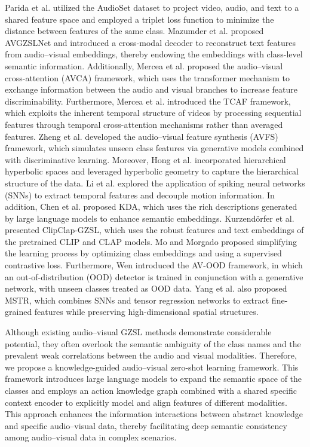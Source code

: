 \documentclass[lettersize,journal]{IEEEtran}
\begin{document}
Parida et al.\cite{3} utilized the AudioSet dataset to project video, audio, and text to a shared feature space and employed a triplet loss function to minimize the distance between features of the same class. Mazumder et al.\cite{4} proposed AVGZSLNet and introduced a cross-modal decoder to reconstruct text features from audio–visual embeddings, thereby endowing the embeddings with class-level semantic information. Additionally, Mercea et al.\cite{1} proposed the audio–visual cross-attention (AVCA) framework, which uses the transformer mechanism to exchange information between the audio and visual branches to increase feature discriminability. Furthermore, Mercea et al.\cite{5} introduced the TCAF framework, which exploits the inherent temporal structure of videos by processing sequential features through temporal cross-attention mechanisms rather than averaged features. Zheng et al.\cite{6} developed the audio–visual feature synthesis (AVFS) framework, which simulates unseen class features via generative models combined with discriminative learning. Moreover, Hong et al.\cite{7} incorporated hierarchical hyperbolic spaces and leveraged hyperbolic geometry to capture the hierarchical structure of the data. Li et al.\cite{8} explored the application of spiking neural networks (SNNs) to extract temporal features and decouple motion information. In addition, Chen et al.\cite{9} proposed KDA, which uses the rich descriptions generated by large language models to enhance semantic embeddings. Kurzendörfer et al.\cite{2} presented ClipClap-GZSL, which uses the robust features and text embeddings of the pretrained CLIP\cite{10} and CLAP\cite{11} models. Mo and Morgado\cite{12} proposed simplifying the learning process by optimizing class embeddings and using a supervised contrastive loss. Furthermore, Wen\cite{13} introduced the AV-OOD framework, in which an out-of-distribution (OOD) detector is trained in conjunction with a generative network, with unseen classes treated as OOD data. Yang et al.\cite{14} also proposed MSTR, which combines SNNs and tensor regression networks to extract fine-grained features while preserving high-dimensional spatial structures.


Although existing audio–visual GZSL methods demonstrate considerable potential, they often overlook the semantic ambiguity of the class names\cite{15} and the prevalent weak correlations between the audio and visual modalities\cite{16}. Therefore, we propose a knowledge-guided audio–visual zero-shot learning framework. This framework introduces large language models to expand the semantic space of the classes and employs an action knowledge graph combined with a shared specific context encoder to explicitly model and align features of different modalities. This approach enhances the information interactions between abstract knowledge and specific audio–visual data, thereby facilitating deep semantic consistency among audio–visual data in complex scenarios.
\end{document}
